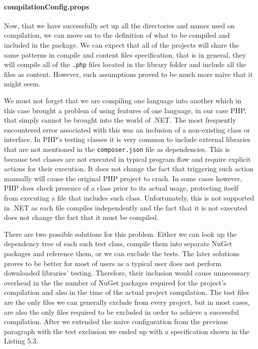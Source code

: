 \paragraph{compilationConfig.props} Now, that we have successfully set up all the directories and names used on compilation, we can move on to the definition of what to be compiled and included in the package. We can expect that all of the projects will share the same patterns in compile and content files specification, that is in general, they will compile all of the \texttt{.php} files located in the library folder and include all the files as content. However, such assumptions proved to be much more naive that it might seem.

We must not forget that we are compiling one language into another which in this case brought a problem of using features of one language, in our case PHP, that simply cannot be brought into the world of .NET. The most frequently encountered error associated with this was an inclusion of a non-existing class or interface. In PHP's testing classes it is very common to include external libraries that are not mentioned in the \texttt{composer.json} file as dependencies. This is because test classes are not executed in typical program flow and require explicit actions for their execution. It does not change the fact that triggering such action manually will cause the original PHP project to crash. In some cases however, PHP does check presence of a class prior to its actual usage, protecting itself from executing a file that includes such class. Unfortunately, this is not supported in .NET as each file compiles independently and the fact that it is not executed does not change the fact that it must be compiled.

There are two possible solutions for this problem. Either we can look up the dependency tree of each such test class, compile them into separate NuGet packages and reference them, or we can exclude the tests. The later solutions proves to be better for most of users as a typical user does not perform downloaded libraries' testing. Therefore, their inclusion would cause unnecessary overhead in the the number of NuGet packages required for the project's compilation and also in the time of the actual project compilation. The test files are the only files we can generally exclude from every project, but in most cases, are also the only files required to be excluded in order to achieve a successful compilation. After we extended the naive configuration from the previous paragraph with the test exclusion we ended up with a specification shown in the Listing 5.3.
 
